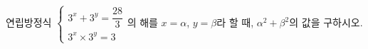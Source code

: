 연립방정식 $\begin{cases} 3^x+3^y=\dfrac{28}{3} \\ 3^x\times 3^y=3 \end{cases}$의 해를 $x=\alpha$, $y=\beta$라 할 때, $\alpha^2+\beta^2$의 값을 구하시오.

